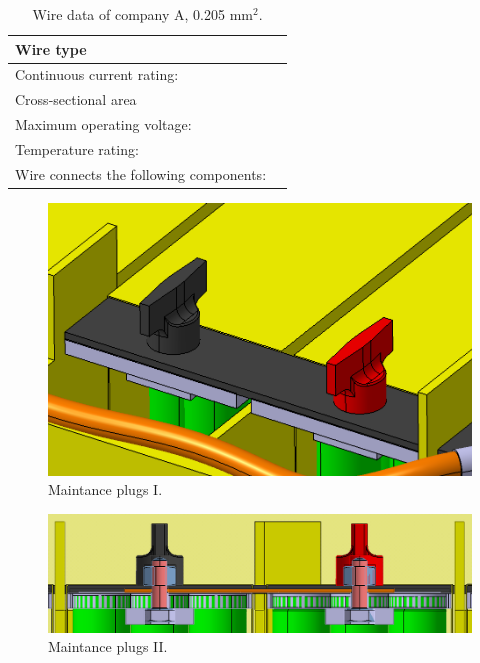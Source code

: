 \begin{table}[htbp]
	\centering
	\caption{Wire data of company A, 0.205 mm$^2$.}
	\begin{tabularx}{\textwidth}{|X|X|}\hline
		Wire type &  \\[\TableSize]\hline
		Continuous current rating: &  \\[\TableSize]\hline
		Cross-sectional area &  \\[\TableSize]\hline
		Maximum operating voltage: &  \\[\TableSize]\hline
		Temperature rating: &  \\[\TableSize]\hline
		Wire connects the following components: &  \\[\TableSize]\hline
	\end{tabularx}%
	\label{tab:acc-wire}%
\end{table}%

\begin{figure}[H]
	\centering
	\includegraphics[width=\textwidth]{./img/ACP-nut.png}
	\caption{Maintance plugs I.}
	\label{fig:acp-maintance-plug}
\end{figure}

\begin{figure}[H]
	\centering
	\includegraphics[width=\textwidth]{./img/ACP-nut2.png}
	\caption{Maintance plugs II.}
	\label{fig:acp-maintance-plug2}
\end{figure}

